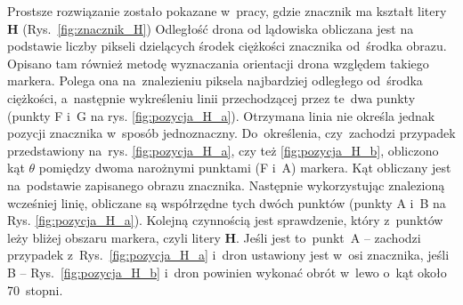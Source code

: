 Prostsze rozwiązanie zostało pokazane w~pracy\cite{H}, gdzie znacznik ma kształt litery \textbf{H} (Rys.~\ref{fig:znacznik_H}) 
Odległość drona od lądowiska obliczana jest na podstawie liczby pikseli dzielących środek ciężkości znacznika od~środka obrazu. 
Opisano tam również metodę wyznaczania orientacji drona względem takiego markera. 
Polega ona na~znalezieniu piksela najbardziej odległego od~środka ciężkości, a~następnie wykreśleniu linii przechodzącej przez te~dwa punkty (punkty F i~G na rys. \ref{fig:pozycja_H_a}).  %
Otrzymana linia nie określa jednak pozycji znacznika w~sposób jednoznaczny.
Do~określenia, czy~zachodzi przypadek przedstawiony na~rys. \ref{fig:pozycja_H_a}, czy też \ref{fig:pozycja_H_b}, obliczono kąt $\theta$ pomiędzy dwoma narożnymi punktami (F i~A) markera. %
Kąt obliczany jest na~podstawie zapisanego obrazu znacznika. 
Następnie wykorzystując znalezioną wcześniej linię, obliczane są współrzędne tych dwóch punktów (punkty A i~B na Rys. \ref{fig:pozycja_H_a}). 
Kolejną czynnością jest sprawdzenie, który z~punktów leży bliżej obszaru markera, czyli litery \textbf{H}. %
Jeśli jest to~punkt~A -- zachodzi przypadek z~Rys.~\ref{fig:pozycja_H_a} i~dron ustawiony jest w~osi znacznika, jeśli B -- Rys.~\ref{fig:pozycja_H_b} i~dron powinien wykonać obrót w~lewo o~kąt około 70~stopni.
